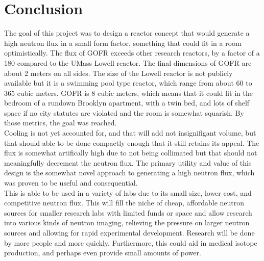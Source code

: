 \section{Conclusion}
\label{sec:conclusion}

The goal of this project was to design a reactor concept that would generate a high neutron flux in a small form factor, something that could fit in a room optimistically. The flux of GOFR exceeds other research reactors, by a factor of a 180 compared to the UMass Lowell reactor. The final dimensions of GOFR are about 2 meters on all sides. The size of the Lowell reactor is not publicly available but it is a swimming pool type reactor, which range from about 60 to 365 cubic meters. GOFR is 8 cubic meters, which means that it could fit in the bedroom of a rundown Brooklyn apartment, with a twin bed, and lots of shelf space if no city statutes are violated and the room is somewhat squarish. By those metrics, the goal was reached.\\

Cooling is not yet accounted for, and that will add not insignifigant volume, but that should able to be done compactly enough that it still retains its appeal. The flux is somewhat artifically high due to not being collimated but that should not meaningfully decrement the neutron flux. The primary utility and value of this design is the somewhat novel approach to generating a high neutron flux, which was proven to be useful and consequential.\\

This is able to be used in a variety of labs due to its small size, lower cost, and competitive neutron flux. This will fill the niche of cheap, affordable neutron sources for smaller research labs with limited funds or space and allow research into various kinds of neutron imaging, relieving the pressure on larger neutron sources and allowing for rapid experimental development. Research will be done by more people and more quickly. Furthermore, this could aid in medical isotope production, and perhaps even provide small amounts of power.\\